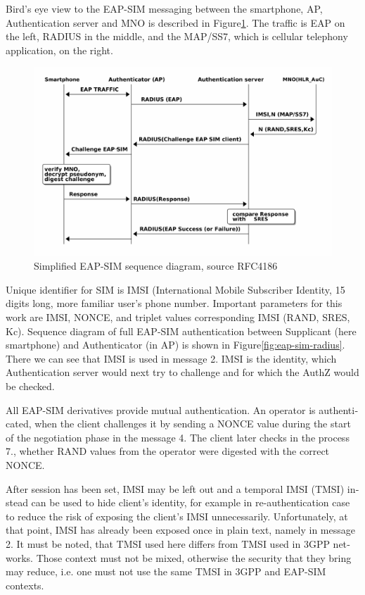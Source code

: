 \documentclass[12pt,a4paper,english]{tutthesis}
\begin{document}
\begin{otherlanguage}{english}
Bird's eye view to the EAP-SIM messaging between the smartphone, AP,
Authentication server and MNO is described in Figure\ref{fig:eap-sim-simple}.
The traffic is EAP on the left, RADIUS  in
the middle, and the MAP/SS7, which is cellular telephony
application, on the right.


\begin{figure}[htb]
\centering
\includegraphics[width=.9\linewidth]{eap-sim-simple.png}
\caption{\label{fig:eap-sim-simple}Simplified EAP-SIM sequence diagram, source RFC4186}
\end{figure}






Unique identifier for SIM is IMSI (International Mobile Subscriber
Identity, 15 digits long, more familiar user's phone number.
Important parameters for this work are IMSI, NONCE, and triplet values
corresponding IMSI (RAND, SRES, Kc).
Sequence diagram of full EAP-SIM authentication between Supplicant (here
smartphone) and Authenticator (in AP) is shown in
Figure\ref{fig:eap-sim-radius}. 
There we can see that IMSI is used in message 2. IMSI is the
identity, which Authentication server would next try to challenge and
for which the AuthZ would be checked.







All EAP-SIM derivatives provide mutual authentication.
An operator is authenticated, when the client challenges it by sending
a NONCE value during the start of the negotiation phase in the
message 4. The client later checks in the process 7., whether RAND
values from the operator were digested with the correct NONCE.

After session has been set, IMSI may be left out and a temporal IMSI
(TMSI) instead can be used to hide client's identity, for example in
re-authentication case to reduce the risk of exposing the client's
IMSI unnecessarily. Unfortunately, at that point, IMSI has already
been exposed once in plain text, namely in message 2.
It must be noted, that TMSI used here differs from TMSI used in 3GPP
networks. Those context must not be mixed, otherwise the security that
they bring may reduce, i.e. one must not use the same TMSI in 3GPP and
EAP-SIM contexts.










\end{otherlanguage}
\end{document}
